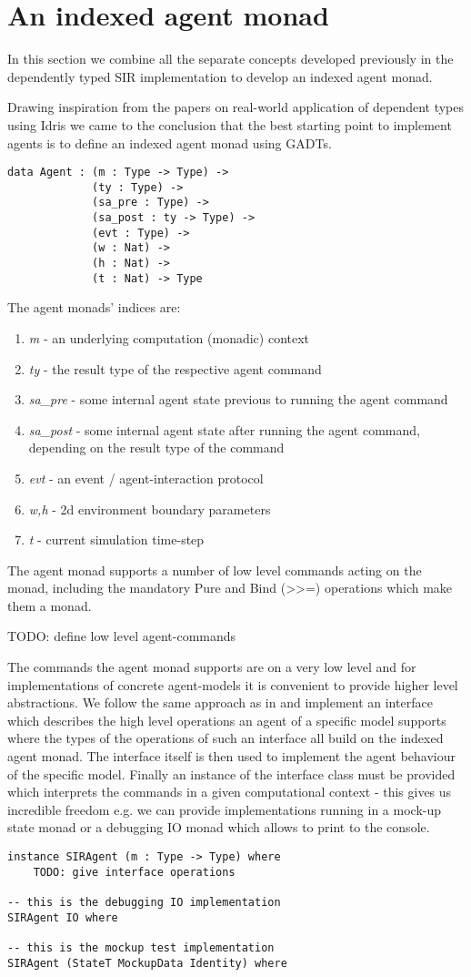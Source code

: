 \section{An indexed agent monad}
In this section we combine all the separate concepts developed previously in the dependently typed SIR implementation to develop an indexed agent monad.

Drawing inspiration from the papers on real-world application of dependent types using Idris we came to the conclusion that the best starting point to implement agents is to define an indexed agent monad using GADTs. 

\begin{verbatim}
data Agent : (m : Type -> Type) -> 
             (ty : Type) ->
             (sa_pre : Type) -> 
             (sa_post : ty -> Type) ->
             (evt : Type) ->
             (w : Nat) -> 
             (h : Nat) -> 
             (t : Nat) -> Type 
\end{verbatim}

The agent monads' indices are:
\begin{enumerate}
	\item \textit{m} - an underlying computation (monadic) context
	\item \textit{ty} - the result type of the respective agent command
	\item \textit{sa\_pre} - some internal agent state previous to running the agent command
	\item \textit{sa\_post} - some internal agent state after running the agent command, depending on the result type of the command
	\item \textit{evt} - an event / agent-interaction protocol
	\item \textit{w,h} - 2d environment boundary parameters
	\item \textit{t} - current simulation time-step
\end{enumerate}

The agent monad supports a number of low level commands acting on the monad, including the mandatory Pure and Bind (>>=) operations which make them a monad.

TODO: define low level agent-commands

The commands the agent monad supports are on a very low level and for implementations of concrete agent-models it is convenient to provide higher level abstractions. We follow the same approach as in \cite{brady_state_2016} and implement an interface which describes the high level operations an agent of a specific model supports where the types of the operations of such an interface all build on the indexed agent monad. The interface itself is then used to implement the agent behaviour of the specific model. Finally an instance of the interface class must be provided which interprets the commands in a given computational context - this gives us incredible freedom e.g. we can provide implementations running in a mock-up state monad or a debugging IO monad which allows to print to the console.

\begin{verbatim}
instance SIRAgent (m : Type -> Type) where
	TODO: give interface operations
	
-- this is the debugging IO implementation
SIRAgent IO where
	
-- this is the mockup test implementation
SIRAgent (StateT MockupData Identity) where
\end{verbatim}